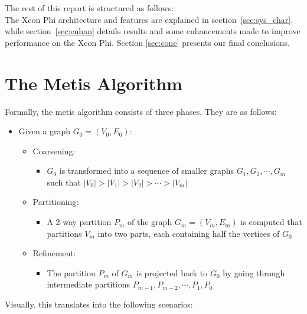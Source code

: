 \documentclass[abstract=on,9pt,twocolumn]{scrartcl}
\begin{document}
The rest of this report is structured as follows:\\
The Xeon Phi architecture and features are explained in section~\ref{sec:sys_char}.
while section~\ref{sec:enhan} details results and some enhancements made
to improve performance on the Xeon Phi. Section \ref{sec:conc} presents
our final conclusions.



\section{The Metis Algorithm}
\label{sec:metis_alg}

  Formally, the metis algorithm consists of three phases. They are as follows:

  \begin{itemize}
  \item Given a graph $G_0 = (V_0,E_0)$:
  \begin{itemize}    
    \item Coarsening:
    \begin{itemize}
      \item $G_0$ is transformed into a sequence of smaller graphs $G_1,G_2,\cdots,G_m$ such that $|V_0|>|V_1|>|V_2|>\cdots>|V_m|$
    \end{itemize}
    \item Partitioning: 
    \begin{itemize}
      \item A 2-way partition $P_m$ of the graph $G_m = (V_m,E_m)$ is computed that partitions $V_m$ into two parts, each containing half the vertices of $G_0$
    \end{itemize}
    \item Refinement:
    \begin{itemize}
      \item The partition $P_m$ of $G_m$ is projected back to $G_0$ by going through intermediate partitions $P_{m-1}, P_{m-2},\cdots,P_1,P_0$
    \end{itemize}
  \end{itemize}
\end{itemize}

Visually, this translates into the following scenarios:
\end{document}
